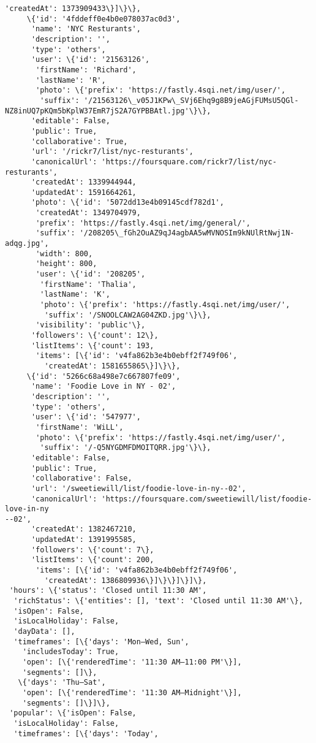 \documentclass[11pt]{article}
\begin{document}
\begin{tcolorbox}[breakable, size=fbox, boxrule=.5pt, pad at break*=1mm, opacityfill=0]
\begin{Verbatim}[commandchars=\\\{\}]
         'createdAt': 1373909433\}]\}\},
     \{'id': '4fddeff0e4b0e078037ac0d3',
      'name': 'NYC Resturants',
      'description': '',
      'type': 'others',
      'user': \{'id': '21563126',
       'firstName': 'Richard',
       'lastName': 'R',
       'photo': \{'prefix': 'https://fastly.4sqi.net/img/user/',
        'suffix': '/21563126\_v05J1KPw\_SVj6Ehq9g8B9jeAGjFUMsU5QGl-
NZ8inUQ7pKQm5bKplW37EmR7jS2A7GYPBBAtl.jpg'\}\},
      'editable': False,
      'public': True,
      'collaborative': True,
      'url': '/rickr7/list/nyc-resturants',
      'canonicalUrl': 'https://foursquare.com/rickr7/list/nyc-resturants',
      'createdAt': 1339944944,
      'updatedAt': 1591664261,
      'photo': \{'id': '5072dd13e4b09145cdf782d1',
       'createdAt': 1349704979,
       'prefix': 'https://fastly.4sqi.net/img/general/',
       'suffix': '/208205\_fGh2OuAZ9qJ4agbAA5wMVNOSIm9kNUlRtNwj1N-adqg.jpg',
       'width': 800,
       'height': 800,
       'user': \{'id': '208205',
        'firstName': 'Thalia',
        'lastName': 'K',
        'photo': \{'prefix': 'https://fastly.4sqi.net/img/user/',
         'suffix': '/SNOOLCAW2AG04ZKD.jpg'\}\},
       'visibility': 'public'\},
      'followers': \{'count': 12\},
      'listItems': \{'count': 193,
       'items': [\{'id': 'v4fa862b3e4b0ebff2f749f06',
         'createdAt': 1581655865\}]\}\},
     \{'id': '5266c68a498e7c667807fe09',
      'name': 'Foodie Love in NY - 02',
      'description': '',
      'type': 'others',
      'user': \{'id': '547977',
       'firstName': 'WiLL',
       'photo': \{'prefix': 'https://fastly.4sqi.net/img/user/',
        'suffix': '/-Q5NYGDMFDMOITQRR.jpg'\}\},
      'editable': False,
      'public': True,
      'collaborative': False,
      'url': '/sweetiewill/list/foodie-love-in-ny--02',
      'canonicalUrl': 'https://foursquare.com/sweetiewill/list/foodie-love-in-ny
--02',
      'createdAt': 1382467210,
      'updatedAt': 1391995585,
      'followers': \{'count': 7\},
      'listItems': \{'count': 200,
       'items': [\{'id': 'v4fa862b3e4b0ebff2f749f06',
         'createdAt': 1386809936\}]\}\}]\}]\},
 'hours': \{'status': 'Closed until 11:30 AM',
  'richStatus': \{'entities': [], 'text': 'Closed until 11:30 AM'\},
  'isOpen': False,
  'isLocalHoliday': False,
  'dayData': [],
  'timeframes': [\{'days': 'Mon–Wed, Sun',
    'includesToday': True,
    'open': [\{'renderedTime': '11:30 AM–11:00 PM'\}],
    'segments': []\},
   \{'days': 'Thu–Sat',
    'open': [\{'renderedTime': '11:30 AM–Midnight'\}],
    'segments': []\}]\},
 'popular': \{'isOpen': False,
  'isLocalHoliday': False,
  'timeframes': [\{'days': 'Today',

\end{Verbatim}
\end{tcolorbox}
\end{document}
